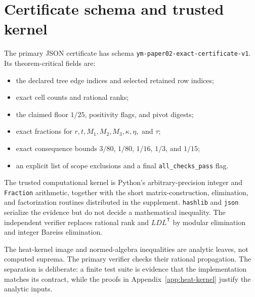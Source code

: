 \section{Certificate schema and trusted kernel}\label{app:certificate}

The primary JSON certificate has schema
\texttt{ym-paper02-exact-certificate-v1}.  Its theorem-critical fields are:
\begin{itemize}
\item the declared tree edge indices and selected retained row indices;
\item exact cell counts and rational ranks;
\item the claimed floor $1/25$, positivity flags, and pivot digests;
\item exact fractions for $r,t,M_1,M_2,M_3,\kappa,\eta,$ and $\tau$;
\item exact consequence bounds $3/80$, $1/80$, $1/16$, $1/3$, and $1/15$;
\item an explicit list of scope exclusions and a final
\texttt{all\_checks\_pass} flag.
\end{itemize}

The trusted computational kernel is Python's arbitrary-precision integer and
\texttt{Fraction} arithmetic, together with the short matrix-construction,
elimination, and factorization routines distributed in the supplement.
\texttt{hashlib} and \texttt{json} serialize the evidence but do not decide a
mathematical inequality.  The independent verifier replaces rational rank and
$LDL^{\mathsf T}$ by modular elimination and integer Bareiss elimination.

The heat-kernel image and normed-algebra inequalities are analytic leaves, not
computed suprema.  The primary verifier checks their rational propagation.
The separation is deliberate: a finite test suite is evidence that the
implementation matches its contract, while the proofs in
Appendix~\ref{app:heat-kernel} justify the analytic inputs.
